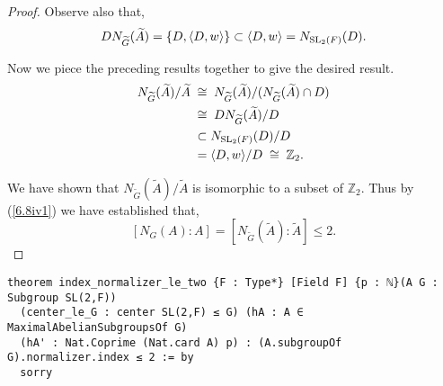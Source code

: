 \begin{proof}
  Observe also that, 
  \begin{align}\label{index1or2} DN_{\widetilde{G}}({\widetilde{A}}) = \{ D, \langle D, w \rangle \} \subset \langle D, w \rangle = N_{\operatorname{SL}_2(F)}(D).
  \end{align}
  
  Now we piece the preceding results together to give the desired result.
  \begin{align*}  N_{\widetilde{G}}({\widetilde{A}}) / {\widetilde{A}} \; & \cong \;  N_{\widetilde{G}}({\widetilde{A}})/( N_{\widetilde{G}}({\widetilde{A}}) \cap D) %
  \\ & \cong \; DN_{\widetilde{G}}({\widetilde{A}}) / D %
  \\ & \subset N_{\SL_2(F)}(D) / D %
  \\ &= \langle D, w \rangle / D \; \cong \; \mathbb{Z}_2.
  \end{align*}
  
  We have shown that $N_{\widetilde{G}}({\widetilde{A}}) / {\widetilde{A}}$ is isomorphic to a subset of $\mathbb{Z}_2$. Thus by (\ref{6.8iv1}) we have established that, $$[N_G(A): A] = [N_{\widetilde{G}}({\widetilde{A}}): {\widetilde{A}}] \leq 2.$$
  \vspace{-2mm}
\end{proof}
\begin{footnotesize}
\begin{verbatim}
theorem index_normalizer_le_two {F : Type*} [Field F] {p : ℕ}(A G : Subgroup SL(2,F))
  (center_le_G : center SL(2,F) ≤ G) (hA : A ∈ MaximalAbelianSubgroupsOf G)
  (hA' : Nat.Coprime (Nat.card A) p) : (A.subgroupOf G).normalizer.index ≤ 2 := by
  sorry
\end{verbatim}
\end{footnotesize}



